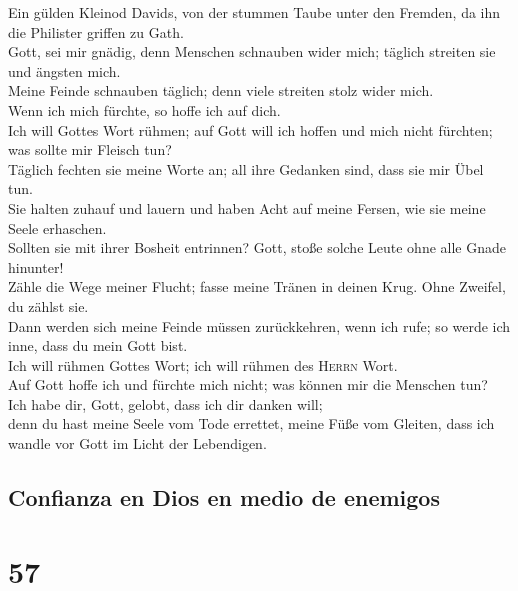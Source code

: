  Ein gülden Kleinod Davids, von der stummen Taube unter
den Fremden, da ihn die Philister griffen zu Gath.\\
 Gott, sei mir gnädig, denn Menschen schnauben wider mich;
täglich streiten sie und ängsten mich.\\
 Meine Feinde schnauben täglich; denn viele streiten stolz
wider mich.\\
 Wenn ich mich fürchte, so hoffe ich auf dich.\\
 Ich will Gottes Wort rühmen; auf Gott will ich hoffen und
mich nicht fürchten; was sollte mir Fleisch tun?\\
 Täglich fechten sie meine Worte an; all ihre Gedanken
sind, dass sie mir Übel tun.\\
 Sie halten zuhauf und lauern und haben Acht auf meine
Fersen, wie sie meine Seele erhaschen.\\
 Sollten sie mit ihrer Bosheit entrinnen? Gott, stoße
solche Leute ohne alle Gnade hinunter!\\
 Zähle die Wege meiner Flucht; fasse meine Tränen in
deinen Krug. Ohne Zweifel, du zählst sie.\\
 Dann werden sich meine Feinde müssen zurückkehren, wenn
ich rufe; so werde ich inne, dass du mein Gott bist.\\
 Ich will rühmen Gottes Wort; ich will rühmen des
\textsc{Herrn} Wort.\\
 Auf Gott hoffe ich und fürchte mich nicht; was können
mir die Menschen tun?\\
 Ich habe dir, Gott, gelobt, dass ich dir danken will;\\
 denn du hast meine Seele vom Tode errettet, meine Füße
vom Gleiten, dass ich wandle vor Gott im Licht der Lebendigen.

\hypertarget{confianza-en-dios-en-medio-de-enemigos}{%
\subsection{Confianza en Dios en medio de
enemigos}\label{confianza-en-dios-en-medio-de-enemigos}}

\hypertarget{section-56}{%
\section{57}\label{section-56}}

